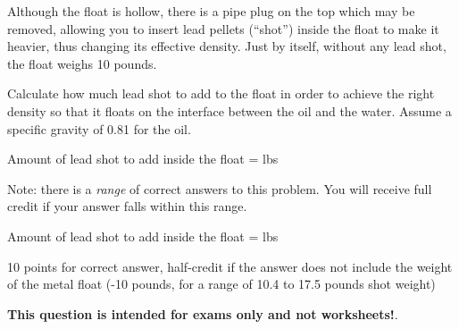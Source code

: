 Although the float is hollow, there is a pipe plug on the top which may be removed, allowing you to insert lead pellets (``shot'') inside the float to make it heavier, thus changing its effective density.  Just by itself, without any lead shot, the float weighs 10 pounds.

Calculate how much lead shot to add to the float in order to achieve the right density so that it floats on the interface between the oil and the water.  Assume a specific gravity of 0.81 for the oil.

\vskip 10pt

Amount of lead shot to add inside the float = \underbar{\hskip 50pt} lbs

\vskip 10pt

Note: there is a {\it range} of correct answers to this problem.  You will receive full credit if your answer falls within this range.







Amount of lead shot to add inside the float =  lbs

\vskip 10pt

10 points for correct answer, half-credit if the answer does not include the weight of the metal float (-10 pounds, for a range of 10.4 to 17.5 pounds shot weight)







{\bf This question is intended for exams only and not worksheets!}.



